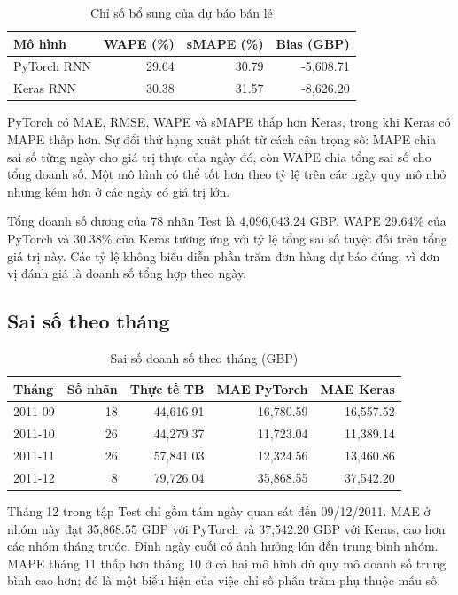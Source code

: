 \documentclass[12pt,a4paper]{report}
\begin{document}
\begin{table}[H]\centering\small
\setlength{\tabcolsep}{4pt}
\caption{Chỉ số bổ sung của dự báo bán lẻ}\label{tab:retail-extra}
\begin{tabular}{@{}lrrr@{}}\toprule
Mô hình & WAPE (\%) & sMAPE (\%) & Bias (GBP) \\\midrule
PyTorch RNN & 29.64 & 30.79 & -5,608.71 \\
Keras RNN & 30.38 & 31.57 & -8,626.20 \\
\bottomrule\end{tabular}
\end{table}

PyTorch có MAE, RMSE, WAPE và sMAPE thấp hơn Keras, trong khi Keras có MAPE thấp hơn. Sự đổi thứ hạng xuất phát từ cách cân trọng số: MAPE chia sai số từng ngày cho giá trị thực của ngày đó, còn WAPE chia tổng sai số cho tổng doanh số. Một mô hình có thể tốt hơn theo tỷ lệ trên các ngày quy mô nhỏ nhưng kém hơn ở các ngày có giá trị lớn.

Tổng doanh số dương của 78 nhãn Test là 4,096,043.24 GBP. WAPE 29.64\% của PyTorch và 30.38\% của Keras tương ứng với tỷ lệ tổng sai số tuyệt đối trên tổng giá trị này. Các tỷ lệ không biểu diễn phần trăm đơn hàng dự báo đúng, vì đơn vị đánh giá là doanh số tổng hợp theo ngày.

\subsection{Sai số theo tháng}
\begin{table}[H]\centering\small
\setlength{\tabcolsep}{4pt}
\caption{Sai số doanh số theo tháng (GBP)}\label{tab:retail-monthly}
\begin{tabular}{@{}lrrrr@{}}\toprule
Tháng & Số nhãn & Thực tế TB & MAE PyTorch & MAE Keras \\\midrule
2011-09 & 18 & 44,616.91 & 16,780.59 & 16,557.52 \\
2011-10 & 26 & 44,279.37 & 11,723.04 & 11,389.14 \\
2011-11 & 26 & 57,841.03 & 12,324.56 & 13,460.86 \\
2011-12 & 8 & 79,726.04 & 35,868.55 & 37,542.20 \\
\bottomrule\end{tabular}
\end{table}

Tháng 12 trong tập Test chỉ gồm tám ngày quan sát đến 09/12/2011. MAE ở nhóm này đạt 35,868.55 GBP với PyTorch và 37,542.20 GBP với Keras, cao hơn các nhóm tháng trước. Đỉnh ngày cuối có ảnh hưởng lớn đến trung bình nhóm. MAPE tháng 11 thấp hơn tháng 10 ở cả hai mô hình dù quy mô doanh số trung bình cao hơn; đó là một biểu hiện của việc chỉ số phần trăm phụ thuộc mẫu số.
\end{document}

